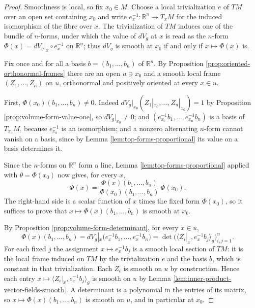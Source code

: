 \begin{proof}
\leanok
{}
Smoothness is local, so fix $x_0 \in M$. Choose a local trivialization $e$ of $TM$ over an open
set containing $x_0$ and write $e^{-1}_x : \mathbb{R}^n \to T_x M$ for the induced isomorphism of
the fibre over $x$. The trivialization of $TM$ induces one of the bundle of $n$-forms, under
which the value of $dV_g$ at $x$ is read as the $n$-form
$\Phi(x) = dV_g|_x \circ e^{-1}_x$ on $\mathbb{R}^n$; thus $dV_g$ is smooth at $x_0$ if and only
if $x \mapsto \Phi(x)$ is.

Fix once and for all a basis $b = (b_1,\ldots,b_n)$ of $\mathbb{R}^n$. By Proposition
\ref{prop:oriented-orthonormal-frames} there are an open $u \ni x_0$ and a smooth local frame
$(Z_1, \ldots, Z_n)$ on $u$, orthonormal and positively oriented at every $x \in u$.

First, $\Phi(x_0)(b_1,\ldots,b_n) \ne 0$. Indeed $dV_g|_{x_0}(Z_1|_{x_0},\ldots,Z_n|_{x_0}) = 1$
by Proposition \ref{prop:volume-form-value-one}, so $dV_g|_{x_0} \ne 0$; and
$(e^{-1}_{x_0} b_1, \ldots, e^{-1}_{x_0} b_n)$ is a basis of $T_{x_0} M$, because $e^{-1}_{x_0}$
is an isomorphism; and a nonzero alternating $n$-form cannot vanish on a basis, since by Lemma
\ref{lem:top-forms-proportional} its value on a basis determines it.

Since the $n$-forms on $\mathbb{R}^n$ form a line, Lemma \ref{lem:top-forms-proportional} applied
with $\theta = \Phi(x_0)$ now gives, for every $x$,
\[
\Phi(x) = \frac{\Phi(x)(b_1,\ldots,b_n)}{\Phi(x_0)(b_1,\ldots,b_n)} \, \Phi(x_0) .
\]
The right-hand side is a scalar function of $x$ times the fixed form $\Phi(x_0)$, so it suffices
to prove that $x \mapsto \Phi(x)(b_1,\ldots,b_n)$ is smooth at $x_0$.

By Proposition \ref{prop:volume-form-determinant}, for every $x \in u$,
\[
\Phi(x)(b_1,\ldots,b_n) = dV_g|_x \bigl(e^{-1}_x b_1, \ldots, e^{-1}_x b_n\bigr)
  = \det \bigl( \langle Z_i|_x, e^{-1}_x b_j \rangle_g \bigr)_{i,j=1}^{n} .
\]
For each fixed $j$ the assignment $x \mapsto e^{-1}_x b_j$ is a smooth local section of $TM$: it
is the local frame induced on $TM$ by the trivialization $e$ and the basis $b$, which is constant
in that trivialization. Each $Z_i$ is smooth on $u$ by construction. Hence each entry
$x \mapsto \langle Z_i|_x, e^{-1}_x b_j \rangle_g$ is smooth on $u$ by Lemma
\ref{lem:inner-product-vector-fields-smooth}. A determinant is a polynomial in the entries of
its matrix, so $x \mapsto \Phi(x)(b_1,\ldots,b_n)$ is smooth on $u$, and in particular at $x_0$.
\end{proof}

